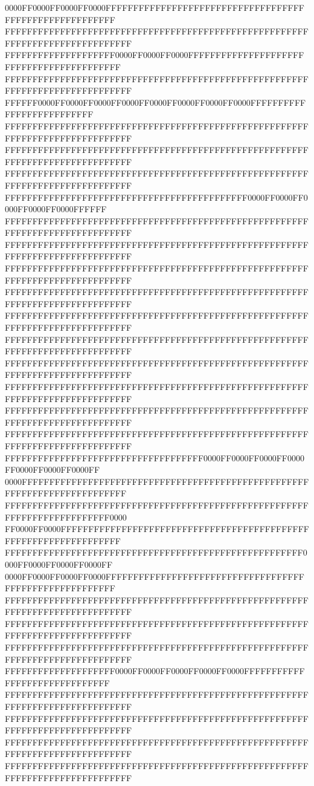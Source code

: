 0000FF0000FF0000FF0000FFFFFFFFFFFFFFFFFFFFFFFFFFFFFFFFFFFFFFFFFFFFFFFFFFFFFFFF
FFFFFFFFFFFFFFFFFFFFFFFFFFFFFFFFFFFFFFFFFFFFFFFFFFFFFFFFFFFFFFFFFFFFFFFFFFFFFF
FFFFFFFFFFFFFFFFFFFF0000FF0000FF0000FFFFFFFFFFFFFFFFFFFFFFFFFFFFFFFFFFFFFFFFFF
FFFFFFFFFFFFFFFFFFFFFFFFFFFFFFFFFFFFFFFFFFFFFFFFFFFFFFFFFFFFFFFFFFFFFFFFFFFFFF
FFFFFF0000FF0000FF0000FF0000FF0000FF0000FF0000FF0000FFFFFFFFFFFFFFFFFFFFFFFFFF
FFFFFFFFFFFFFFFFFFFFFFFFFFFFFFFFFFFFFFFFFFFFFFFFFFFFFFFFFFFFFFFFFFFFFFFFFFFFFF
FFFFFFFFFFFFFFFFFFFFFFFFFFFFFFFFFFFFFFFFFFFFFFFFFFFFFFFFFFFFFFFFFFFFFFFFFFFFFF
FFFFFFFFFFFFFFFFFFFFFFFFFFFFFFFFFFFFFFFFFFFFFFFFFFFFFFFFFFFFFFFFFFFFFFFFFFFFFF
FFFFFFFFFFFFFFFFFFFFFFFFFFFFFFFFFFFFFFFFFFFF0000FF0000FF0000FF0000FF0000FFFFFF
FFFFFFFFFFFFFFFFFFFFFFFFFFFFFFFFFFFFFFFFFFFFFFFFFFFFFFFFFFFFFFFFFFFFFFFFFFFFFF
FFFFFFFFFFFFFFFFFFFFFFFFFFFFFFFFFFFFFFFFFFFFFFFFFFFFFFFFFFFFFFFFFFFFFFFFFFFFFF
FFFFFFFFFFFFFFFFFFFFFFFFFFFFFFFFFFFFFFFFFFFFFFFFFFFFFFFFFFFFFFFFFFFFFFFFFFFFFF
FFFFFFFFFFFFFFFFFFFFFFFFFFFFFFFFFFFFFFFFFFFFFFFFFFFFFFFFFFFFFFFFFFFFFFFFFFFFFF
FFFFFFFFFFFFFFFFFFFFFFFFFFFFFFFFFFFFFFFFFFFFFFFFFFFFFFFFFFFFFFFFFFFFFFFFFFFFFF
FFFFFFFFFFFFFFFFFFFFFFFFFFFFFFFFFFFFFFFFFFFFFFFFFFFFFFFFFFFFFFFFFFFFFFFFFFFFFF
FFFFFFFFFFFFFFFFFFFFFFFFFFFFFFFFFFFFFFFFFFFFFFFFFFFFFFFFFFFFFFFFFFFFFFFFFFFFFF
FFFFFFFFFFFFFFFFFFFFFFFFFFFFFFFFFFFFFFFFFFFFFFFFFFFFFFFFFFFFFFFFFFFFFFFFFFFFFF
FFFFFFFFFFFFFFFFFFFFFFFFFFFFFFFFFFFFFFFFFFFFFFFFFFFFFFFFFFFFFFFFFFFFFFFFFFFFFF
FFFFFFFFFFFFFFFFFFFFFFFFFFFFFFFFFFFFFFFFFFFFFFFFFFFFFFFFFFFFFFFFFFFFFFFFFFFFFF
FFFFFFFFFFFFFFFFFFFFFFFFFFFFFFFFFFFF0000FF0000FF0000FF0000FF0000FF0000FF0000FF
0000FFFFFFFFFFFFFFFFFFFFFFFFFFFFFFFFFFFFFFFFFFFFFFFFFFFFFFFFFFFFFFFFFFFFFFFFFF
FFFFFFFFFFFFFFFFFFFFFFFFFFFFFFFFFFFFFFFFFFFFFFFFFFFFFFFFFFFFFFFFFFFFFFFFFF0000
FF0000FF0000FFFFFFFFFFFFFFFFFFFFFFFFFFFFFFFFFFFFFFFFFFFFFFFFFFFFFFFFFFFFFFFFFF
FFFFFFFFFFFFFFFFFFFFFFFFFFFFFFFFFFFFFFFFFFFFFFFFFFFFFF0000FF0000FF0000FF0000FF
0000FF0000FF0000FF0000FFFFFFFFFFFFFFFFFFFFFFFFFFFFFFFFFFFFFFFFFFFFFFFFFFFFFFFF
FFFFFFFFFFFFFFFFFFFFFFFFFFFFFFFFFFFFFFFFFFFFFFFFFFFFFFFFFFFFFFFFFFFFFFFFFFFFFF
FFFFFFFFFFFFFFFFFFFFFFFFFFFFFFFFFFFFFFFFFFFFFFFFFFFFFFFFFFFFFFFFFFFFFFFFFFFFFF
FFFFFFFFFFFFFFFFFFFFFFFFFFFFFFFFFFFFFFFFFFFFFFFFFFFFFFFFFFFFFFFFFFFFFFFFFFFFFF
FFFFFFFFFFFFFFFFFFFF0000FF0000FF0000FF0000FF0000FFFFFFFFFFFFFFFFFFFFFFFFFFFFFF
FFFFFFFFFFFFFFFFFFFFFFFFFFFFFFFFFFFFFFFFFFFFFFFFFFFFFFFFFFFFFFFFFFFFFFFFFFFFFF
FFFFFFFFFFFFFFFFFFFFFFFFFFFFFFFFFFFFFFFFFFFFFFFFFFFFFFFFFFFFFFFFFFFFFFFFFFFFFF
FFFFFFFFFFFFFFFFFFFFFFFFFFFFFFFFFFFFFFFFFFFFFFFFFFFFFFFFFFFFFFFFFFFFFFFFFFFFFF
FFFFFFFFFFFFFFFFFFFFFFFFFFFFFFFFFFFFFFFFFFFFFFFFFFFFFFFFFFFFFFFFFFFFFFFFFFFFFF
